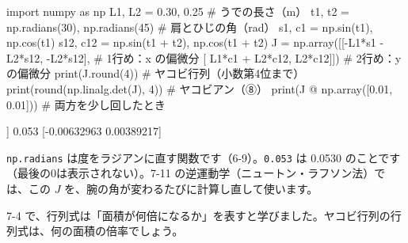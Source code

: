 \begin{bkcode}[Python]
import numpy as np
L1, L2 = 0.30, 0.25                \# うでの長さ（m）
t1, t2 = np.radians(30), np.radians(45)   \# 肩とひじの角（rad）
s1, c1 = np.sin(t1), np.cos(t1)
s12, c12 = np.sin(t1 + t2), np.cos(t1 + t2)
J = np.array([[-L1*s1 - L2*s12, -L2*s12],   \# 1行め：x の偏微分
              [ L1*c1 + L2*c12,  L2*c12]])  \# 2行め：y の偏微分
print(J.round(4))                  \# ヤコビ行列（小数第4位まで）
print(round(np.linalg.det(J), 4))  \# ヤコビアン（⑧）
print(J @ np.array([0.01, 0.01]))  \# 両方を少し回したとき
\end{bkcode}
\begin{bkcodeout}[実行結果]
[[-0.3915 -0.2415]
 [ 0.3245  0.0647]]
0.053
[-0.00632963  0.00389217]
\end{bkcodeout}
\texttt{np.radians} は度をラジアンに直す関数です（6-9）。\texttt{0.053} は 0.0530 のことです（最後の0は表示されない）。7-11 の逆運動学（ニュートン・ラフソン法）では、この $J$ を、腕の角が変わるたびに計算し直して使います。


\leavevmode\label{bk:8-3:jacobian}7-4 で、行列式は「面積が何倍になるか」を表すと学びました。ヤコビ行列の行列式は、何の面積の倍率でしょう。

